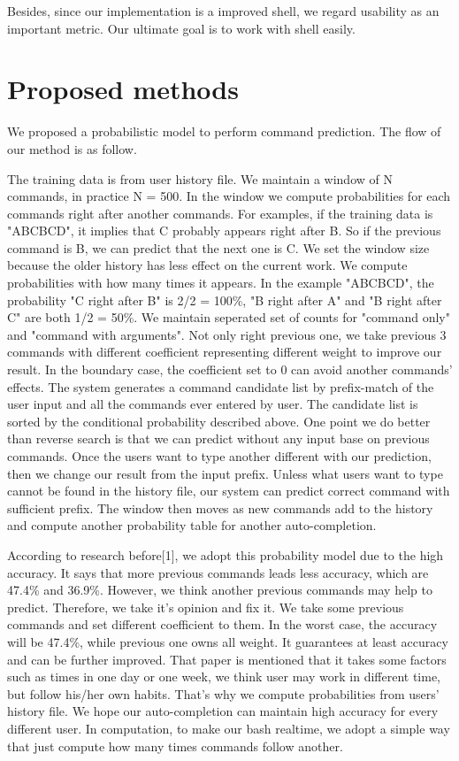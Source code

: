 \documentclass[11pt,a4paper]{article}
\begin{document}
Besides, since our implementation is a improved shell, we regard usability as an important metric.
Our ultimate goal is to work with shell easily.

\section*{Proposed methods}
We proposed a probabilistic model to perform command prediction.
The flow of our method is as follow.
\par
The training data is from user history file. 
We maintain a window of N commands, in practice N = 500. 
In the window we compute probabilities for each commands right after another commands. 
For examples, if the training data is "ABCBCD", it implies that C probably appears right after B.
So if the previous command is B, we can predict that the next one is C.
We set the window size because the older history has less effect on the current work. 
We compute probabilities with how many times it appears.
In the example "ABCBCD", the probability "C right after B" is 2/2 = 100\%, 
"B right after A" and "B right after C" are both 1/2 = 50\%. 
We maintain seperated set of counts for "command only" and "command with arguments".
Not only right previous one, we take previous 3 commands with different coefficient representing different weight to improve our result.
In the boundary case, the coefficient set to 0 can avoid another commands' effects. 
The system generates a command candidate list by prefix-match of the user input and all the commands ever entered by user.
The candidate list is sorted by the conditional probability described above.
One point we do better than reverse search is that we can predict without any input base on previous commands. 
Once the users want to type another different with our prediction, then we change our result from the input prefix.
Unless what users want to type cannot be found in the history file, 
our system can predict correct command with sufficient prefix.
The window then moves as new commands add to the history and compute another probability table for another auto-completion.
\par
According to research before[1], we adopt this probability model due to the high accuracy. 
It says that more previous commands leads less accuracy, which are 47.4\% and 36.9\%. 
However, we think another previous commands may help to predict. 
Therefore, we take it's opinion and fix it. 
We take some previous commands and set different coefficient to them. 
In the worst case, the accuracy will be 47.4\%, while previous one owns all weight. 
It guarantees at least accuracy and can be further improved. 
That paper is mentioned that it takes some factors such as times in one day or one week, 
we think user may work in different time, but follow his/her own habits.
That's why we compute probabilities from users' history file. 
We hope our auto-completion can maintain high accuracy for every different user. 
In computation, to make our bash realtime, we adopt a simple way that just compute how many times commands follow another. 
\end{document}
